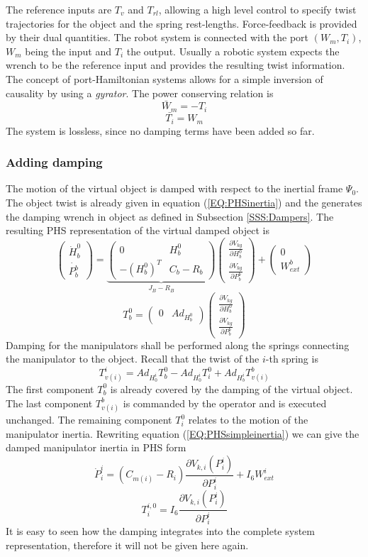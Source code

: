 \documentclass[a4paper,twoside, openright,12pt]{report}
\begin{document}
The reference inputs are $T_v$ and $T_{rl}$, allowing a high level control to specify twist trajectories for the object and the spring rest-lengths. Force-feedback is provided by their dual quantities. The robot system is connected with the port $(W_m,T_i)$, $W_m$ being the input and $T_i$ the output. Usually a robotic system expects the wrench to be the reference input and provides the resulting twist information. The concept of port-Hamiltonian systems allows for a simple inversion of causality by using a \emph{gyrator}. The power conserving relation is \[ \bar{W}_m = -T_i\]
\[ \bar{T_i} = W_m \]
The system is lossless, since no damping terms have been added so far.
\subsubsection{Adding damping}
The motion of the virtual object is damped with respect to the inertial frame $\Psi_0$. The object twist is already given in equation (\ref{EQ:PHSinertia}) and  the generates the damping wrench in object as defined in Subsection \ref{SSS:Dampers}. The resulting PHS representation of the virtual damped object is 
\[
\begin{pmatrix}\dot{H}_b^0 \\ \dot{P_b^b}\end{pmatrix} =
\underbrace{\begin{pmatrix} 0 & H_b^0  \\
- (H_b^0)^T & C_b-R_b\end{pmatrix}}_{J_B-R_B}
\begin{pmatrix}\frac{\partial V_{kg}}{\partial H_b^0} \\ \frac{\partial V_{kg}}{\partial P_b^b}\end{pmatrix}+
\begin{pmatrix}0 \\ W_{ext}^b\end{pmatrix} \]
\[T_b^0 = \begin{pmatrix}0 & Ad_{H_b^0}\end{pmatrix}
\begin{pmatrix}\frac{\partial V_{kg}}{\partial H_b^0} \\ \frac{\partial V_{kg}}{\partial P_b^b}\end{pmatrix}
\]
Damping for the manipulators shall be performed along the springs connecting the manipulator to the object. Recall that the twist of the $i$-th spring is 
\[ T_{v(i)}^i = Ad_{H_0^i} T_b^0 - Ad_{H_0^i} T_i^0 + Ad_{H_b^i} T_{v(i)}^b \]
The first component $T_b^0$ is already covered by the damping of the virtual object. The last component $T_{v(i)}^b$ is commanded by the operator and is executed unchanged. The remaining component $T_i^0$ relates to the motion of the manipulator inertia. Rewriting equation (\ref{EQ:PHSsimpleinertia}) we can give the damped manipulator inertia in PHS form
\[ 	\dot{P}_{i}^{i} = (C_{m(i)}-R_i) \frac{\partial V_{k,i}(P_{i}^{i})}{\partial P_{i}^{i}} + I_6 W_{ext}^{i} \]
\[	T_i^{i,0} = I_6 \frac{\partial V_{k,i}(P_i^i)}{\partial P_i^i} \]
It is easy to seen how the damping integrates into the complete system representation, therefore it will not be given here again.
\end{document}
